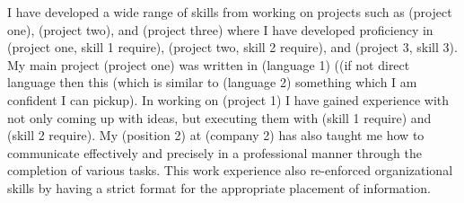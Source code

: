 I have developed a wide range of skills from working on projects such as (project one), (project two), and (project three) where I have developed proficiency in (project one, skill 1 require), (project two, skill 2 require), and (project 3, skill 3). My main project (project one) was written in (language 1) ((if not direct language then this (which is similar to (language 2) something which I am confident I can pickup). In working on (project 1) I have gained experience with not only coming up with ideas, but executing them with (skill 1 require) and (skill 2 require). My (position 2) at (company 2) has also taught me how to communicate effectively and precisely in a professional manner through the completion of various tasks. This work experience also re-enforced organizational skills by having a strict format for the appropriate placement of information.
